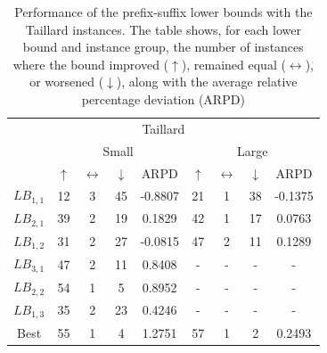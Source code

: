\documentclass{article}
\theoremstyle{thmstyleone}%
\theoremstyle{thmstyletwo}%
\theoremstyle{thmstylethree}%
\begin{document}
\begin{table}[]
\centering
\begin{tabular}{c|cccc|cccc|}
\multicolumn{9}{c}{Taillard} \\ 
\multirow{2}{*}{} & \multicolumn{4}{c|}{Small}                            & \multicolumn{4}{c|}{Large}                            \\ \hline
                  & $\uparrow$ & $\leftrightarrow$ & $\downarrow$ & ARPD & $\uparrow$ & $\leftrightarrow$ & $\downarrow$ & ARPD \\
$LB_{1,1}$ & 12 & 3 & 45 & -0.8807 & 21 & 1 & 38 & -0.1375\\
$LB_{2,1}$ & 39 & 2 & 19 & 0.1829 & 42 & 1 & 17 & 0.0763\\
$LB_{1,2}$ & 31 & 2 & 27 & -0.0815 & 47 & 2 & 11 & 0.1289\\
$LB_{3,1}$ & 47 & 2 & 11 & 0.8408 & - & - & - & -\\
$LB_{2,2}$ & 54 & 1 & 5 & 0.8952 & - & - & - & -\\
$LB_{1,3}$ & 35 & 2 & 23 & 0.4246 & - & - & - & -\\ \hline
Best & 55 & 1 & 4 & 1.2751 & 57 & 1 & 2 & 0.2493 \\ \hline
\end{tabular}
    \caption{Performance of the prefix-suffix lower bounds with the Taillard instances. The table shows, for each lower bound and instance group, the number of instances where the bound improved ($\uparrow$), remained equal ($\leftrightarrow$), or worsened ($\downarrow$), along with the average relative percentage deviation (ARPD)}
    \label{Table:PerformanceLBTaillard}
\end{table}
\end{document}
